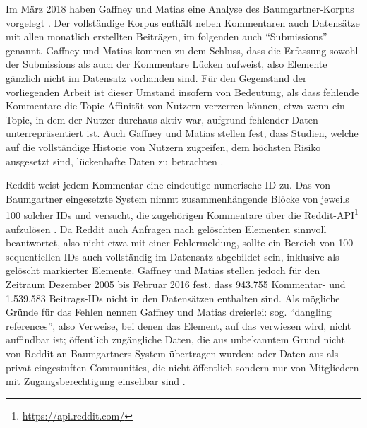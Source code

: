 \documentclass[11pt,a4paper,twoside]{article}
\let\rmarkdownfootnote\footnote%
\def\footnote{\protect\rmarkdownfootnote}
\begin{document}
Im März 2018 haben Gaffney und Matias eine Analyse des
Baumgartner-Korpus vorgelegt \autocite{Gaffney2018}. Der vollständige
Korpus enthält neben Kommentaren auch Datensätze mit allen monatlich
erstellten Beiträgen, im folgenden auch \enquote{Submissions} genannt.
Gaffney und Matias kommen zu dem Schluss, dass die Erfassung sowohl der
Submissions als auch der Kommentare Lücken aufweist, also Elemente
gänzlich nicht im Datensatz vorhanden sind. Für den Gegenstand der
vorliegenden Arbeit ist dieser Umstand insofern von Bedeutung, als dass
fehlende Kommentare die Topic-Affinität von Nutzern verzerren können,
etwa wenn ein Topic, in dem der Nutzer durchaus aktiv war, aufgrund
fehlender Daten unterrepräsentiert ist. Auch Gaffney und Matias stellen
fest, dass Studien, welche auf die vollständige Historie von Nutzern
zugreifen, dem höchsten Risiko ausgesetzt sind, lückenhafte Daten zu
betrachten \autocite{Gaffney2018}.

Reddit weist jedem Kommentar eine eindeutige numerische ID zu. Das von
Baumgartner eingesetzte System nimmt zusammenhängende Blöcke von jeweils
100 solcher IDs und versucht, die zugehörigen Kommentare über die
Reddit-API\footnote{\url{https://api.reddit.com/}} aufzulösen
\autocite{Baumgartner2018a}. Da Reddit auch Anfragen nach gelöschten
Elementen sinnvoll beantwortet, also nicht etwa mit einer Fehlermeldung,
sollte ein Bereich von 100 sequentiellen IDs auch vollständig im
Datensatz abgebildet sein, inklusive als gelöscht markierter Elemente.
Gaffney und Matias stellen jedoch für den Zeitraum Dezember 2005 bis
Februar 2016 fest, dass 943.755 Kommentar- und 1.539.583 Beitrags-IDs
nicht in den Datensätzen enthalten sind. Als mögliche Gründe für das
Fehlen nennen Gaffney und Matias dreierlei: sog. \enquote{dangling
references}, also Verweise, bei denen das Element, auf das verwiesen
wird, nicht auffindbar ist; öffentlich zugängliche Daten, die aus
unbekanntem Grund nicht von Reddit an Baumgartners System übertragen
wurden; oder Daten aus als privat eingestuften Communities, die nicht
öffentlich sondern nur von Mitgliedern mit Zugangsberechtigung einsehbar
sind \autocite{Gaffney2018}.
\end{document}
